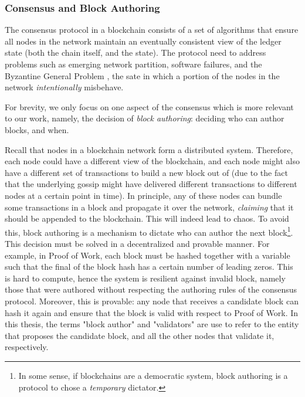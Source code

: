 \subsubsection{Consensus and Block Authoring} \label{chap_bg:subsec:consensus_authorship}


The consensus protocol in a blockchain consists of a set of algorithms that ensure all nodes in the
network maintain an eventually consistent view of the ledger state (both the chain itself, and the
state). The protocol need to address problems such as emerging network partition, software failures,
and the Byzantine General Problem \cite{lamportByzantineGeneralsProblem1982}, the sate in which a
portion of the nodes in the network \textit{intentionally} misbehave.

For brevity, we only focus on one aspect of the consensus which is more relevant to our work,
namely, the decision of \textit{block authoring}: deciding who can author blocks, and when.

Recall that nodes in a blockchain network form a distributed system. Therefore, each node could have
a different view of the blockchain, and each node might also have a different set of transactions to
build a new block out of (due to the fact that the underlying gossip might have delivered different
transactions to different nodes at a certain point in time). In principle, any of these nodes can
bundle some transactions in a block and propagate it over the network, \textit{claiming} that it
should be appended to the blockchain. This will indeed lead to chaos. To avoid this, block authoring
is a mechanism to dictate who can author the next block\footnote{In some sense, if blockchains are a
democratic system, block authoring is a protocol to chose a \textit{temporary} dictator.}. This
decision must be solved in a decentralized and provable manner. For example, in Proof of Work, each
block must be hashed together with a variable such that the final of the block hash has a certain
number of leading zeros. This is hard to compute, hence the system is resilient against invalid
block, namely those that were authored without respecting the authoring rules of the consensus
protocol. Moreover, this is provable: any node that receives a candidate block can hash it again and
ensure that the block is valid with respect to Proof of Work. In this thesis, the terms "block
author" and "validators" are use to refer to the entity that proposes the candidate block, and all
the other nodes that validate it, respectively.

